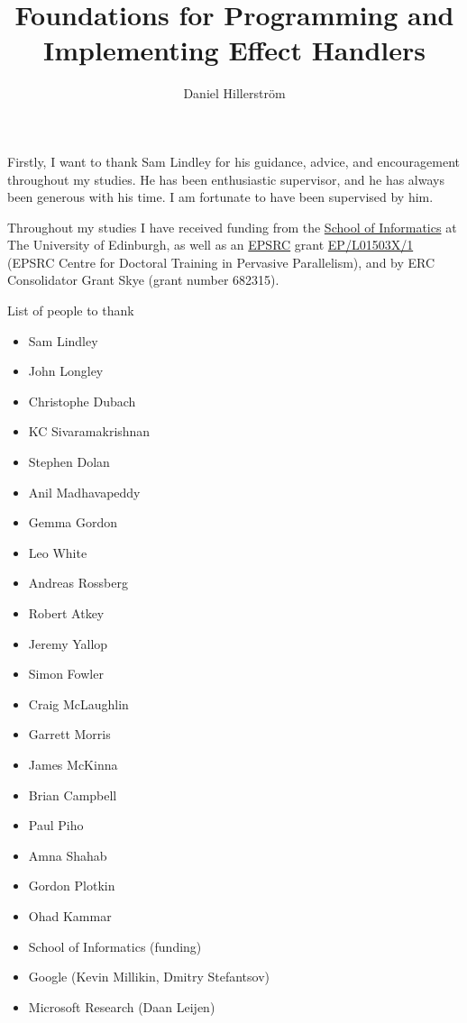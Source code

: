 \documentclass[12pt,phd,lfcs,twoside,openright,logo,leftchapter,normalheadings]{infthesis}
\title{Foundations for Programming and Implementing Effect Handlers}
\author{Daniel Hillerström}
\theoremstyle{plain}
\theoremstyle{definition}
\begin{document}
\raggedbottom
\begin{preliminary}

\maketitle

\begin{acknowledgements}
  Firstly, I want to thank Sam Lindley for his guidance, advice, and
  encouragement throughout my studies. He has been enthusiastic
  supervisor, and he has always been generous with his time. I am
  fortunate to have been supervised by him.

  Throughout my studies I have received funding from the
  \href{https://www.ed.ac.uk/informatics}{School of Informatics} at
  The University of Edinburgh, as well as an
  \href{https://www.epsrc.ac.uk/}{EPSRC} grant
  \href{http://pervasiveparallelism.inf.ed.ac.uk}{EP/L01503X/1} (EPSRC
  Centre for Doctoral Training in Pervasive Parallelism), and by ERC
  Consolidator Grant Skye (grant number 682315).

  List of people to thank
  \begin{itemize}
    \item Sam Lindley
    \item John Longley
    \item Christophe Dubach
    \item KC Sivaramakrishnan
    \item Stephen Dolan
    \item Anil Madhavapeddy
    \item Gemma Gordon
    \item Leo White
    \item Andreas Rossberg
    \item Robert Atkey
    \item Jeremy Yallop
    \item Simon Fowler
    \item Craig McLaughlin
    \item Garrett Morris
    \item James McKinna
    \item Brian Campbell
    \item Paul Piho
    \item Amna Shahab
    \item Gordon Plotkin
    \item Ohad Kammar
    \item School of Informatics (funding)
    \item Google (Kevin Millikin, Dmitry Stefantsov)
    \item Microsoft Research (Daan Leijen)
  \end{itemize}
\end{acknowledgements}


\end{preliminary}
\end{document}
